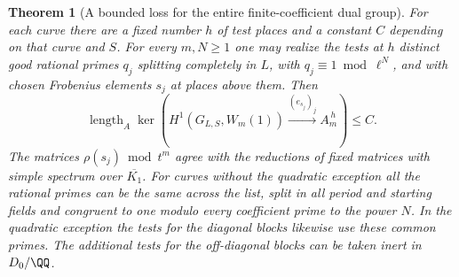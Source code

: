 \documentclass[a4paper,11pt]{article}
\newtheorem{theorem}[proposition]{Theorem}
\theoremstyle{definition}
\theoremstyle{remark}
\numberwithin{equation}{section}
\begin{document}
\begin{theorem}[A bounded loss for the entire finite-coefficient dual group]
\leavevmode\label{thm:dualcurve598}
For each curve there are a fixed number \(h\) of test places
and a constant \(C\) depending on that curve and \(S\).
For every \(m,N\ge1\) one may realize the tests at \(h\)
distinct good rational primes \(q_j\) splitting completely
in \(L\), with \(q_j\equiv1\bmod\ell^N\), and with chosen
Frobenius elements \(s_j\) at places above them. Then
\[
  \operatorname{length}_A
  \ker\left(H^1(G_{L,S},W_m(1))
        \xrightarrow{(e_{s_j})_j} A_m^{\,h}\right)\le C .
\]
The matrices \(\rho(s_j)\bmod t^m\) agree with the
reductions of fixed matrices with simple spectrum over
\(\overline{K_1}\). For curves without the quadratic
exception all the rational primes can be the same across
the list, split in all period and starting fields and
congruent to one modulo every coefficient prime to the
power \(N\). In the quadratic exception the tests for
the diagonal blocks likewise use these common primes.
The additional tests for the off-diagonal blocks can be
taken inert in \(D_0/\QQ\).
\end{theorem}
\end{document}
